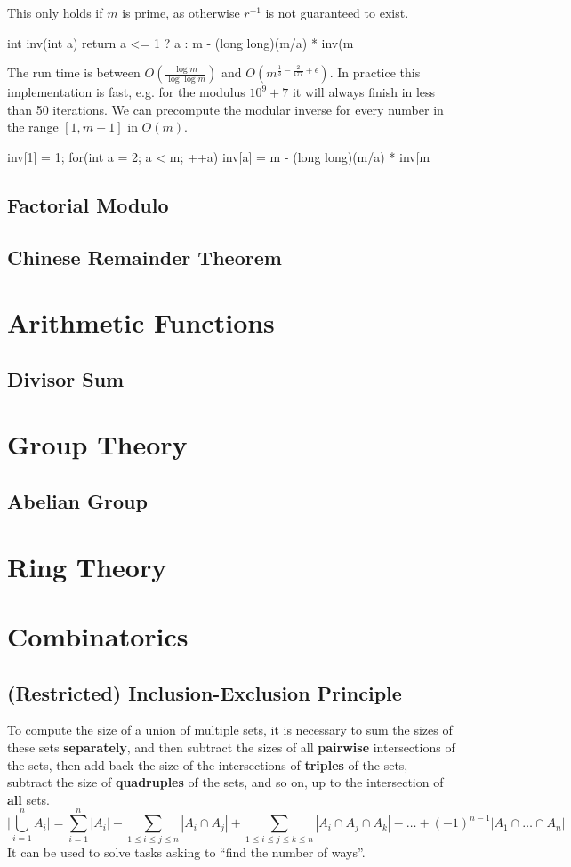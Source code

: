 \documentclass[12pt]{extarticle}
\begin{document}
This only holds if $m$ is prime, as otherwise $r^{-1}$ is not guaranteed to exist.
\begin{cpp}
int inv(int a) {
  return a <= 1 ? a : m - (long long)(m/a) * inv(m %
}
\end{cpp}
The run time is between $O(\frac{\log m}{\log \log m})$ and $O(m^{\frac{1}{3}-\frac{2}{177}+\epsilon})$. In practice this implementation is fast, e.g. for the modulus $10^9 + 7$ it will always finish in less than 50 iterations. 
We can precompute the modular inverse for every number in the range $[1,m-1]$ in $O(m)$. 
\begin{cpp}
inv[1] = 1;
for(int a = 2; a < m; ++a)
    inv[a] = m - (long long)(m/a) * inv[m%
\end{cpp}
\subsection*{Factorial Modulo}
\subsection*{Chinese Remainder Theorem}
\section*{Arithmetic Functions}
\subsection*{Divisor Sum}
\section*{Group Theory}
\subsection*{Abelian Group}
\section*{Ring Theory}

\newpage
\section*{Combinatorics}
\subsection*{(Restricted) Inclusion-Exclusion Principle}
To compute the size of a union of multiple sets, it is necessary to sum the sizes of these sets \textbf{separately}, and then subtract the sizes of all \textbf{pairwise} intersections of the sets, then add back the size of the intersections of \textbf{triples} of the sets, subtract the size of \textbf{quadruples} of the sets, and so on, up to the intersection of \textbf{all} sets.
$$\Bigg|\bigcup_{i=1}^{n}A_{i}\Bigg| =\sum_{i=1}^{n}|A_{i}|-\sum_{1\leq i\leq j\leq n} |A_{i}\cap A_{j}|+\sum_{1\leq i\leq j\leq k\leq n}|A_{i}\cap A_{j}\cap A_{k}|-\dots+(-1)^{n-1}|A_{1}\cap\dots\cap A_{n}|$$
It can be used to solve tasks asking to ``find the number of ways''.
\end{document}
